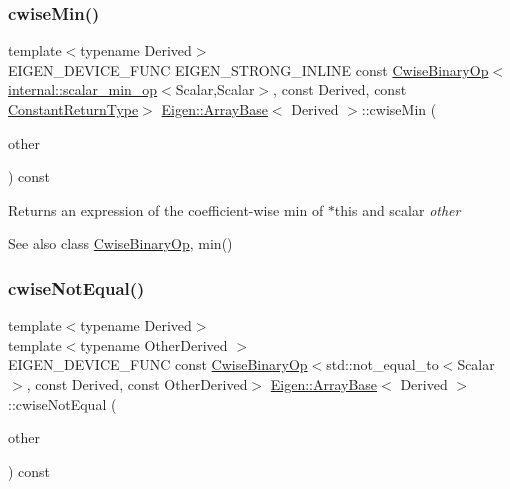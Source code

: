 \subsubsection{\texorpdfstring{cwiseMin()}{cwiseMin()}\hspace{0.1cm}{\footnotesize\ttfamily [2/2]}}
{\footnotesize\ttfamily template$<$typename Derived$>$ \\
E\+I\+G\+E\+N\+\_\+\+D\+E\+V\+I\+C\+E\+\_\+\+F\+U\+NC E\+I\+G\+E\+N\+\_\+\+S\+T\+R\+O\+N\+G\+\_\+\+I\+N\+L\+I\+NE const \mbox{\hyperlink{class_eigen_1_1_cwise_binary_op}{Cwise\+Binary\+Op}}$<$\mbox{\hyperlink{struct_eigen_1_1internal_1_1scalar__min__op}{internal\+::scalar\+\_\+min\+\_\+op}}$<$Scalar,Scalar$>$, const Derived, const \mbox{\hyperlink{class_eigen_1_1_cwise_nullary_op}{Constant\+Return\+Type}}$>$ \mbox{\hyperlink{class_eigen_1_1_array_base}{Eigen\+::\+Array\+Base}}$<$ Derived $>$\+::cwise\+Min (\begin{DoxyParamCaption}\item[{const Scalar \&}]{other }\end{DoxyParamCaption}) const\hspace{0.3cm}{\ttfamily [inline]}}

\begin{DoxyReturn}{Returns}
an expression of the coefficient-\/wise min of $\ast$this and scalar {\itshape other} 
\end{DoxyReturn}
\begin{DoxySeeAlso}{See also}
class \mbox{\hyperlink{class_eigen_1_1_cwise_binary_op}{Cwise\+Binary\+Op}}, min() 
\end{DoxySeeAlso}
\mbox{\label{class_eigen_1_1_array_base_a69fb89b5cc84d7043cce9df0f371ed10}} 
\subsubsection{\texorpdfstring{cwiseNotEqual()}{cwiseNotEqual()}}
{\footnotesize\ttfamily template$<$typename Derived$>$ \\
template$<$typename Other\+Derived $>$ \\
E\+I\+G\+E\+N\+\_\+\+D\+E\+V\+I\+C\+E\+\_\+\+F\+U\+NC const \mbox{\hyperlink{class_eigen_1_1_cwise_binary_op}{Cwise\+Binary\+Op}}$<$std\+::not\+\_\+equal\+\_\+to$<$Scalar$>$, const Derived, const Other\+Derived$>$ \mbox{\hyperlink{class_eigen_1_1_array_base}{Eigen\+::\+Array\+Base}}$<$ Derived $>$\+::cwise\+Not\+Equal (\begin{DoxyParamCaption}\item[{const E\+I\+G\+E\+N\+\_\+\+C\+U\+R\+R\+E\+N\+T\+\_\+\+S\+T\+O\+R\+A\+G\+E\+\_\+\+B\+A\+S\+E\+\_\+\+C\+L\+A\+SS$<$ Other\+Derived $>$ \&}]{other }\end{DoxyParamCaption}) const\hspace{0.3cm}{\ttfamily [inline]}}

